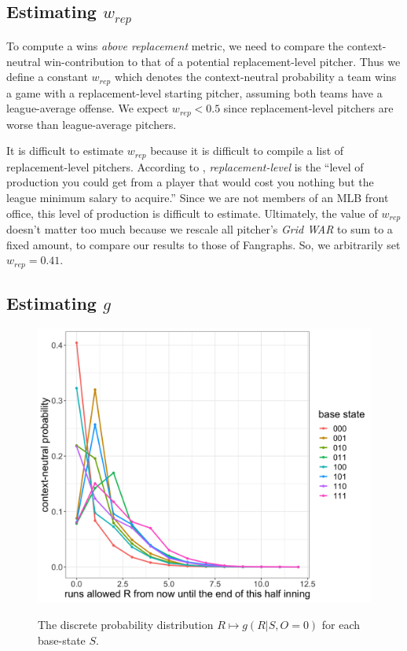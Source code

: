 \documentclass[12pt]{article}
\begin{document}
\subsection{Estimating $w_{rep}$}

To compute a wins \textit{above replacement} metric, we need to compare the context-neutral win-contribution to that of a potential replacement-level pitcher. Thus we define a constant $w_{rep}$ which denotes the context-neutral probability a team wins a game with a replacement-level starting pitcher, assuming both teams have a league-average offense. We expect $w_{rep} < 0.5$ since replacement-level pitchers are worse than league-average pitchers. 

It is difficult to estimate $w_{rep}$ because it is difficult to compile a list of replacement-level pitchers. According to \citet{ReplacementLevel}, \textit{replacement-level} is the ``level of production you could get from a player that would cost you nothing but the league minimum salary to acquire.'' Since we are not members of an MLB front office, this level of production is difficult to estimate. Ultimately, the value of $w_{rep}$ doesn't matter too much because we rescale all pitcher's \textit{Grid WAR} to sum to a fixed amount, to compare our results to those of Fangraphs. So, we arbitrarily set $w_{rep} = 0.41$. 

\subsection{Estimating $g$}

\begin{figure}[t!]
\centering
\caption{The discrete probability distribution $R \mapsto g(R|S,O=0)$ for each base-state $S$.} 
\includegraphics[width=15cm]{../writeup_plots/plot_gRSO_R0.png}
\label{fig:g0}
\end{figure}
\end{document}
